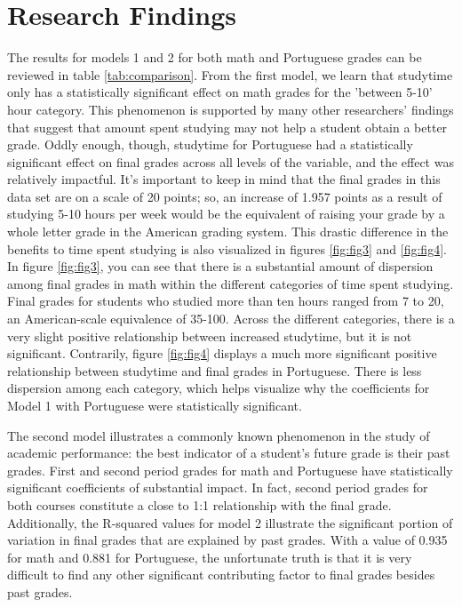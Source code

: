 \documentclass[12pt,english]{article}
\begin{document}
\section{Research Findings}\label{sec:results}
The results for models 1 and 2 for both math and Portuguese grades can be reviewed in table \ref{tab:comparison}. From the first model, we learn that studytime only has a statistically significant effect on math grades for the 'between 5-10' hour category. This phenomenon is supported by many other researchers' findings that suggest that amount spent studying may not help a student obtain a better grade. Oddly enough, though, studytime for Portuguese had a statistically significant effect on final grades across all levels of the variable, and the effect was relatively impactful. It's important to keep in mind that the final grades in this data set are on a scale of 20 points; so, an increase of 1.957 points as a result of studying 5-10 hours per week would be the equivalent of raising your grade by a whole letter grade in the American grading system. This drastic difference in the benefits to time spent studying is also visualized in figures \ref{fig:fig3} and \ref{fig:fig4}. In figure \ref{fig:fig3}, you can see that there is a substantial amount of dispersion among final grades in math within the different categories of time spent studying. Final grades for students who studied more than ten hours ranged from 7 to 20, an American-scale equivalence of 35-100. Across the different categories, there is a very slight positive relationship between increased studytime, but it is not significant. Contrarily, figure \ref{fig:fig4} displays a much more significant positive relationship between studytime and final grades in Portuguese. There is less dispersion among each category, which helps visualize why the coefficients for Model 1 with Portuguese were statistically significant.  

The second model illustrates a commonly known phenomenon in the study of academic performance: the best indicator of a student's future grade is their past grades. First and second period grades for math and Portuguese have statistically significant coefficients of substantial impact. In fact, second period grades for both courses constitute a close to 1:1 relationship with the final grade. Additionally, the R-squared values for model 2 illustrate the significant portion of variation in final grades that are explained by past grades. With a value of 0.935 for math and 0.881 for Portuguese, the unfortunate truth is that it is very difficult to find any other significant contributing factor to final grades besides past grades.
\end{document}
